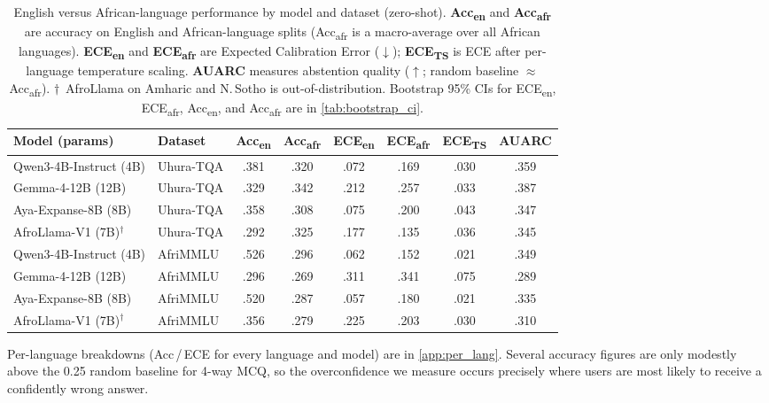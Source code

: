 \documentclass[11pt,a4paper]{article}
\begin{document}
\begin{table}[t]
\centering
\caption{%
  English versus African-language performance by model and dataset (zero-shot).
  \textbf{Acc\textsubscript{en}} and \textbf{Acc\textsubscript{afr}} are
  accuracy on English and African-language splits (Acc\textsubscript{afr} is a
  macro-average over all African languages). \textbf{ECE\textsubscript{en}} and
  \textbf{ECE\textsubscript{afr}} are Expected Calibration Error ($\downarrow$);
  \textbf{ECE\textsubscript{TS}} is ECE after per-language temperature scaling.
  \textbf{AUARC} measures abstention quality ($\uparrow$; random baseline
  $\approx$ Acc\textsubscript{afr}).
  $\dagger$~AfroLlama on Amharic and N.\,Sotho is out-of-distribution.
  Bootstrap 95\% CIs for ECE\textsubscript{en}, ECE\textsubscript{afr},
  Acc\textsubscript{en}, and Acc\textsubscript{afr} are in \cref{tab:bootstrap_ci}.
}
\label{tab:main}
\small
\begin{tabular}{llcccccc}
\toprule
\textbf{Model (params)} & \textbf{Dataset}
  & \textbf{Acc\textsubscript{en}} & \textbf{Acc\textsubscript{afr}}
  & \textbf{ECE\textsubscript{en}} & \textbf{ECE\textsubscript{afr}}
  & \textbf{ECE\textsubscript{TS}} & \textbf{AUARC} \\
\midrule
Qwen3-4B-Instruct (4B)      & Uhura-TQA  & .381 & .320 & .072 & .169 & .030 & .359 \\
Gemma-4-12B (12B)           & Uhura-TQA  & .329 & .342 & .212 & .257 & .033 & .387 \\
Aya-Expanse-8B (8B)         & Uhura-TQA  & .358 & .308 & .075 & .200 & .043 & .347 \\
AfroLlama-V1 (7B)$^\dagger$ & Uhura-TQA  & .292 & .325 & .177 & .135 & .036 & .345 \\
\midrule
Qwen3-4B-Instruct (4B)      & AfriMMLU   & .526 & .296 & .062 & .152 & .021 & .349 \\
Gemma-4-12B (12B)           & AfriMMLU   & .296 & .269 & .311 & .341 & .075 & .289 \\
Aya-Expanse-8B (8B)         & AfriMMLU   & .520 & .287 & .057 & .180 & .021 & .335 \\
AfroLlama-V1 (7B)$^\dagger$ & AfriMMLU   & .356 & .279 & .225 & .203 & .030 & .310 \\
\bottomrule
\end{tabular}
\end{table}

Per-language breakdowns (Acc\,/\,ECE for every language and model) are in
\cref{app:per_lang}. Several accuracy figures are only modestly above the
0.25 random baseline for 4-way MCQ, so the overconfidence we measure occurs
precisely where users are most likely to receive a confidently wrong answer.
\end{document}
